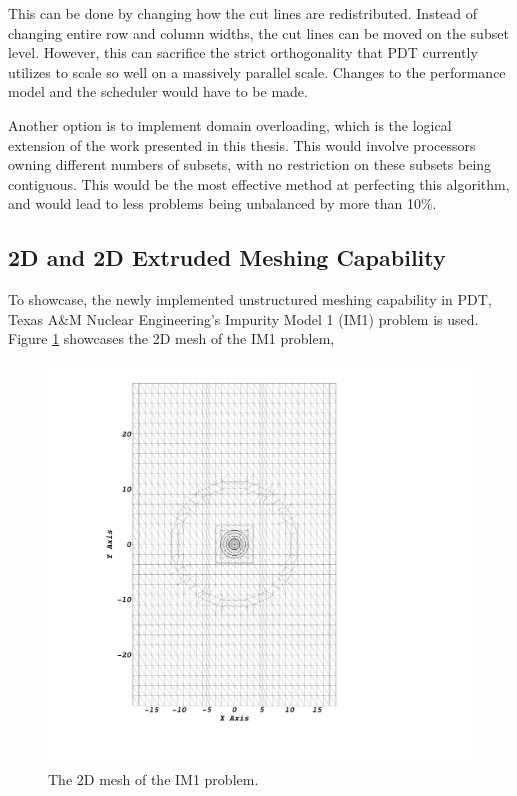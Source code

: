 \documentclass{anstrans}
\begin{document}
This can be done by changing how the cut lines are redistributed. Instead of changing entire row and column widths, the cut lines can be moved on the subset level. However, this can sacrifice the strict orthogonality that PDT currently utilizes to scale so well on a massively parallel scale. Changes to the performance model and the scheduler would have to be made.

Another option is to implement domain overloading, which is the logical extension of the work presented in this thesis. This would involve processors owning different numbers of subsets, with no restriction on these subsets being contiguous. This would be the most effective method at perfecting this algorithm, and would lead to less problems being unbalanced by more than 10\%.

\subsection{2D and 2D Extruded Meshing Capability}

To showcase, the newly implemented unstructured meshing capability in PDT, Texas A\&M Nuclear Engineering's Impurity Model 1 (IM1) problem is used. Figure \ref{IM12D} showcases the 2D mesh of the IM1 problem,

\begin{figure}[H]
\centering
\includegraphics[scale = 0.13, trim=28cm  4cm 0cm 4cm,clip]{figures/im12d.png}
\caption{The 2D mesh of the IM1 problem.}
\label{IM12D}
\end{figure}
\end{document}
